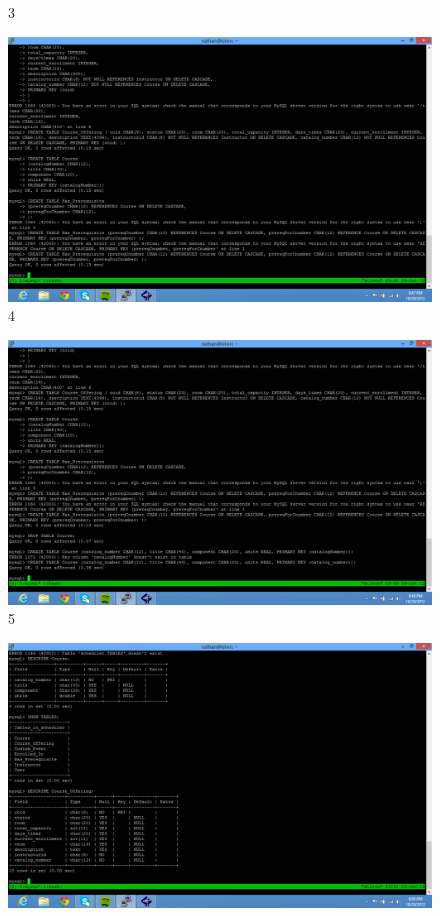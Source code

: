 \documentclass[pdftex,12pt,letter]{article}
\begin{document}
\begin{flushleft}
\begin{figure}
\figurename{ 3}
\end{figure}
\begin{figure}
\includegraphics[width=140mm]{db4.png}
\figurename{ 4}
\end{figure}
\begin{figure}
\includegraphics[width=140mm]{db5.png}
\figurename{ 5}
\end{figure}
\begin{figure}
\includegraphics[width=140mm]{db6.png}

\end{figure}
\end{flushleft}
\end{document}
